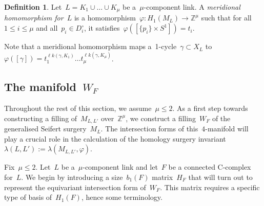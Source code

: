 \documentclass[10.9pt,a4paper]{amsart}
\theoremstyle{definition}
\newtheorem{definition}[theorem]{Definition}
\theoremstyle{remark}
\newcommand{\Z}{\mathbb{Z}}
\newcommand{\lk}{\ell k}
\begin{document}
\begin{definition}
\label{def:meridional}
Let~$L=K_1\cup\dots\cup K_\mu$ be a~$\mu$-component link. A {\em meridional homomorphism for~$L$\/} is a homomorphism~$\varphi\colon H_1(M_L)\to\Z^\mu$
such that for all~$1\le i\le\mu$ and all~$p_i\in D^\circ_i$, it satisfies~$\varphi([\{p_i\}\times S^1])=t_i$.
\end{definition}

Note that a meridional homomorphism maps a~1-cycle~$\gamma\subset X_L$ to~$\varphi([\gamma])=t_1^{\lk(\gamma,K_1)} \ldots t_\mu^{\lk(\gamma,K_\mu)}$.



\subsection{The manifold~$W_F$}
\label{sub:WF}
Throughout the rest of this section, we assume~$\mu\le 2$.
As a first step towards constructing a filling of~$M_{L,L'}$ over~$\Z^\mu$, we construct a filling~$W_F$ of the generalised Seifert surgery~$M_L$.
The intersection forms of this~$4$-manifold will play a crucial role in the calculation of the homology surgery invariant~$\lambda(L,L'):=\lambda(M_{L,L'},\varphi).$

\medbreak

Fix~$\mu \leq 2$. 
Let~$L$ be a~$\mu$-component link and let~$F$ be a connected C-complex for~$L$.
We begin by introducing a size~$b_1(F)$ matrix~$H_F$ that will turn out to represent the equivariant intersection form of~$W_F$. This matrix requires a specific type of basis of~$H_1(F)$, hence some terminology.
\end{document}
